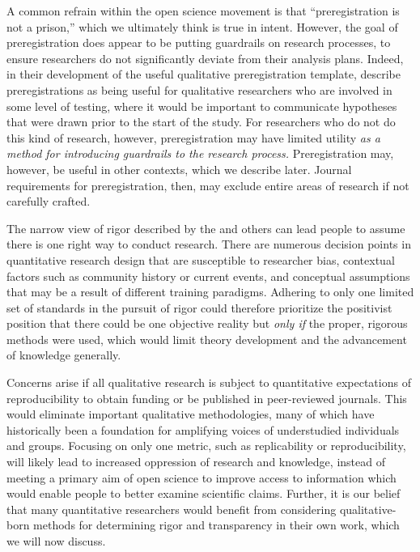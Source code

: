 \documentclass[authordate, meta]{jote-new-article}
\begin{document}
A common refrain within the open science movement is that “preregistration is not a prison,” \parencites[e.g.,][]{DeHaven2017}{Mellor2021} which we ultimately think is true in intent. However, the goal of preregistration does appear to be putting guardrails on research processes, to ensure researchers do not significantly deviate from their analysis plans. Indeed, in their development of the useful qualitative preregistration template, \textcites{Haven2020} describe preregistrations as being useful for qualitative researchers who are involved in some level of testing, where it would be important to communicate hypotheses that were drawn prior to the start of the study. For researchers who do not do this kind of research, however, preregistration may have limited utility \emph{as a method for introducing guardrails to the research process.} Preregistration may, however, be useful in other contexts, which we describe later. Journal requirements for preregistration, then, may exclude entire areas of research if not carefully crafted.



The narrow view of rigor described by the \textcite{NIHND} and others can lead people to assume there is one right way to conduct research. There are numerous decision points in quantitative research design that are susceptible to researcher bias, contextual factors such as community history or current events, and conceptual assumptions that may be a result of different training paradigms. Adhering to only one limited set of standards in the pursuit of rigor could therefore prioritize the positivist position that there could be one objective reality but \emph{only if} the proper, rigorous methods were used, which would limit theory development and the advancement of knowledge generally.



Concerns arise if all qualitative research is subject to quantitative expectations of reproducibility to obtain funding or be published in peer-reviewed journals. This would eliminate important qualitative methodologies, many of which have historically been a foundation for amplifying voices of understudied individuals and groups. Focusing on only one metric, such as replicability or reproducibility, will likely lead to increased oppression of research and knowledge, instead of meeting a primary aim of open science to improve access to information which would enable people to better examine scientific claims. Further, it is our belief that many quantitative researchers would benefit from considering qualitative-born methods for determining rigor and transparency in their own work, which we will now discuss.
\end{document}
